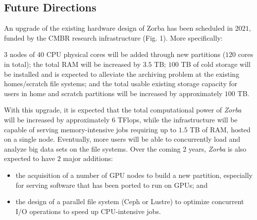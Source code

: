    \subsection*{Future Directions}

   An upgrade of the existing hardware design of Zorba has been scheduled in $2021$, funded by the CMBR research infrastructure (Fig. 1). More specifically:

   $3$ nodes of $40$ CPU physical cores will be added through new partitions ($120$ cores in total);
   the total RAM will be increased by $3.5$ TB;
   $100$ TB of cold storage will be installed and is expected to alleviate the archiving problem at the existing homes/scratch file systems; 
   and the total usable existing storage capacity for users in home and scratch partitions will be increased by approximately $100$ TB.
   
   With this upgrade, it is expected that the total computational power of \textit{Zorba} will be increased by approximately $6$ TFlops, while the infrastructure will be capable of serving memory-intensive jobs requiring up to $1.5$ TB of RAM, hosted on a single node. 
   Eventually, more users will be able to concurrently load and analyze big data sets on the file systems. 
   Over the coming $2$ years, \textit{Zorba} is also expected to have $2$ major additions:
   
   \begin{itemize}
      \item  the acquisition of a number of GPU nodes to build a new partition, especially for serving software that has been ported to run on GPUs; and
      \item the design of a parallel file system (Ceph or Lustre) to optimize concurrent I/O operations to speed up CPU-intensive jobs.
   \end{itemize}

